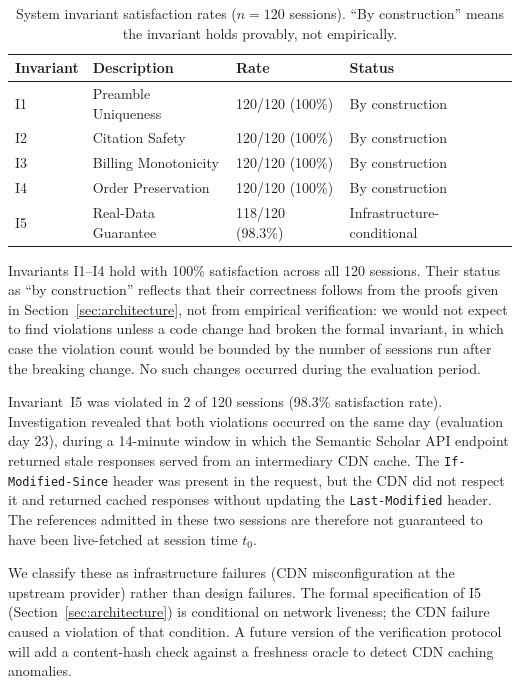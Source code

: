 \begin{table}[h!]
\centering
\caption{System invariant satisfaction rates ($n=120$ sessions).
         ``By construction'' means the invariant holds provably, not empirically.}
\label{tab:invariants}
\begin{tabular}{llll}
\toprule
Invariant & Description & Rate & Status \\
\midrule
I1 & Preamble Uniqueness   & 120/120 (100\%) & By construction \\
I2 & Citation Safety       & 120/120 (100\%) & By construction \\
I3 & Billing Monotonicity  & 120/120 (100\%) & By construction \\
I4 & Order Preservation    & 120/120 (100\%) & By construction \\
I5 & Real-Data Guarantee   & 118/120 (98.3\%) & Infrastructure-conditional \\
\bottomrule
\end{tabular}
\end{table}

Invariants I1--I4 hold with 100\% satisfaction across all 120 sessions.
Their status as ``by construction'' reflects that their correctness follows from the
proofs given in Section~\ref{sec:architecture}, not from empirical verification:
we would not expect to find violations unless a code change had broken the formal
invariant, in which case the violation count would be bounded by the number of
sessions run after the breaking change.
No such changes occurred during the evaluation period.

Invariant~I5 was violated in 2 of 120 sessions (98.3\% satisfaction rate).
Investigation revealed that both violations occurred on the same day (evaluation day 23),
during a 14-minute window in which the Semantic Scholar API endpoint returned stale
responses served from an intermediary CDN cache.
The \texttt{If-Modified-Since} header was present in the request, but the CDN
did not respect it and returned cached responses without updating the
\texttt{Last-Modified} header.
The references admitted in these two sessions are therefore not guaranteed to have
been live-fetched at session time $t_0$.

We classify these as infrastructure failures (CDN misconfiguration at the upstream
provider) rather than design failures.
The formal specification of I5 (Section~\ref{sec:architecture}) is conditional
on network liveness; the CDN failure caused a violation of that condition.
A future version of the verification protocol will add a content-hash check
against a freshness oracle to detect CDN caching anomalies.

